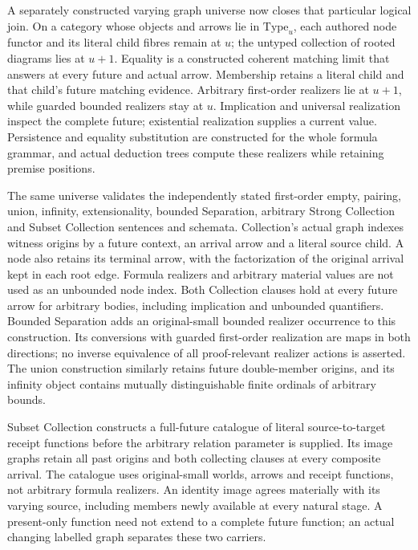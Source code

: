 \documentclass[11pt]{article}
\theoremstyle{definition}
\theoremstyle{remark}
\begin{document}
A separately constructed varying graph universe now closes that
particular logical join. On a category whose objects and arrows lie in
\(\mathrm{Type}_u\), each authored node functor and its literal child
fibres remain at \(u\); the untyped collection of rooted diagrams lies
at \(u+1\). Equality is a constructed coherent matching limit that
answers at every future and actual arrow. Membership retains a literal
child and that child's future matching evidence. Arbitrary first-order
realizers lie at \(u+1\), while guarded bounded realizers stay at \(u\).
Implication and universal realization inspect the complete future;
existential realization supplies a current value. Persistence and equality
substitution are constructed for the whole formula grammar, and actual
deduction trees compute these realizers while retaining premise positions.

The same universe validates the independently stated first-order empty,
pairing, union, infinity, extensionality, bounded Separation, arbitrary
Strong Collection and Subset Collection sentences and schemata. Collection's actual graph
indexes witness origins by a future context, an arrival arrow and a
literal source child. A node also retains its terminal arrow, with the
factorization of the original arrival kept in each root edge. Formula
realizers and arbitrary material values are not used as an unbounded
node index. Both Collection clauses hold at every future arrow for
arbitrary bodies, including implication and unbounded quantifiers.
Bounded Separation adds an original-small bounded realizer occurrence
to this construction. Its conversions with guarded first-order realization
are maps in both directions; no inverse equivalence of all proof-relevant
realizer actions is asserted. The union construction similarly retains
future double-member origins, and its infinity object contains mutually
distinguishable finite ordinals of arbitrary bounds.

Subset Collection constructs a full-future catalogue of literal source-to-target
receipt functions before the arbitrary relation parameter is supplied. Its
image graphs retain all past origins and both collecting clauses at every
composite arrival. The catalogue uses original-small worlds, arrows and
receipt functions, not arbitrary formula realizers. An identity image agrees
materially with its varying source, including members newly available at every
natural stage. A present-only function need not extend to a complete future
function; an actual changing labelled graph separates these two carriers.
\end{document}

